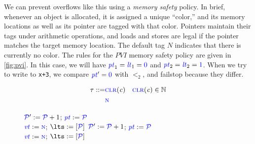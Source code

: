 \documentclass{llncs}
\begin{document}
\begin{table}[t]
We can prevent overflows like this using a {\em memory safety} policy. In brief, whenever
an object is allocated, it is assigned a unique ``color,'' and its memory locations as well
as its pointer are tagged with that color. Pointers maintain their tags under arithmetic
operations, and loads and stores are legal if the pointer matches the target memory location.
The default tag \(N\) indicates that there is currently no color.
The rules for the \(PVI\) memory safety policy are given in \cref{fig:pvi}. In this case, we will
have \(\mathit{\color{blue} pt}_1 = \mathit{\color{blue} lt}_1 = {\color{blue} 0}\) and \(\mathit{\color{blue} pt}_2 = \mathit{\color{blue} lt}_2 = {\color{blue} 1}\). When we try to write to {\tt x+3},
we compare \(\mathit{\color{blue} pt}' = {\color{blue} 0}\) with \(\lt_2\), and failstop because they differ.

\begin{figure}
  \color{blue}
  \begin{align*}
    \tau ::= & \textnormal{\color{blue} \sc clr}(\mathit{c}) & \textnormal{\color{blue} \sc clr}(\mathit{c}) \in \mathbb{N} \\
    & \textnormal{\color{blue} \sc n} \\
  \end{align*}
  
  \scriptsize
  \begin{minipage}[t]{0.3\textwidth}
    \vspace{-2.5em}

  \end{minipage}
  \begin{minipage}[t]{0.25\textwidth}
    \vspace{-2.5em}
    \localtruleblock
        {\(\mathcal{\color{blue} P\mathit{}}' := \mathcal{\color{blue} P\mathit{}}+1\);
          \(\mathit{\color{blue} pt} := \mathcal{\color{blue} P\mathit{}}\)\\
          \(\mathit{\color{blue} vt} := \textnormal{\color{blue} \sc n}\);
          \(\lts := \left[ \PCT \right]\)
        }
    \malloctruleblock
        {\(\mathcal{\color{blue} P\mathit{}}' := \mathcal{\color{blue} P\mathit{}}+1\);
          \(\mathit{\color{blue} pt} := \mathcal{\color{blue} P\mathit{}}\) \\
          \(\mathit{\color{blue} vt} := \textnormal{\color{blue} \sc n}\);
          \(\lts := \left[ \PCT \right]\)
        }
  \end{minipage}
  \begin{minipage}[t]{0.3\textwidth}
    \vspace{-2.5em}

  \end{minipage}


\end{figure}
\end{table}
\end{document}
